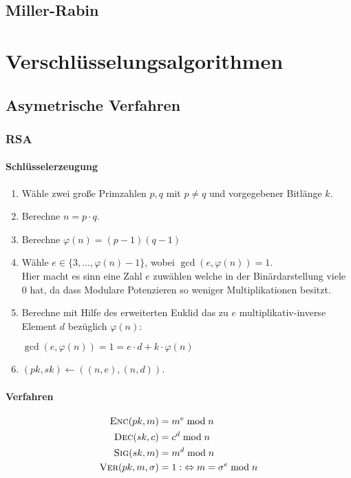 \documentclass[a4paper,landscape]{article}
\newcommand{\plaint}{\ensuremath{m}}
\newcommand{\ciphert}{\ensuremath{c}}
\newcommand{\skey}{\ensuremath{sk}}
\newcommand{\pkey}{\ensuremath{pk}}
\newcommand{\enc}{\textsc{Enc}}
\newcommand{\dec}{\textsc{Dec}}
\newcommand{\sig}{\textsc{Sig}}
\newcommand{\ver}{\textsc{Ver}}
\begin{document}
\begin{multicols*}{4}
	\subsection{Miller-Rabin}

	\section{Verschlüsselungsalgorithmen}
	\subsection{Asymetrische Verfahren}
	\subsubsection{RSA}
	\paragraph{Schlüsselerzeugung}
	\begin{enumerate}
		\item Wähle zwei große Primzahlen \(p, q\) mit \(p \neq q\) und
		      vorgegebener Bitlänge \(k\).
		\item Berechne \(n = p \cdot q\).
		\item Berechne \(\varphi(n) = (p - 1)(q - 1)\)
		\item Wähle \(e \in \{3, \dotsc, \varphi(n) - 1\}\), wobei
		      \(\gcd(e, \varphi(n)) = 1\). \\
		      Hier macht es sinn eine Zahl \(e\) zuwählen welche in der
		      Binärdarstellung viele \(0\) hat, da dass Modulare Potenzieren so
		      weniger Multiplikationen besitzt.
		\item Berechne mit Hilfe des erweiterten Euklid das zu \(e\)
		      multiplikativ-inverse Element \(d\) bezüglich
		      \(\varphi(n)\): \par
		      \(\gcd(e,\varphi(n)) = 1 = e \cdot d + k \cdot \varphi(n)\)
		\item \((\pkey, \skey) \leftarrow ((n,e), (n,d))\).
	\end{enumerate}

	\paragraph{Verfahren}
	\begin{align*}
		\enc(\pkey,\plaint)        & = \plaint^{e} \bmod n                               \\
		\dec(\skey,\ciphert)       & = \ciphert^{d} \bmod n                              \\
		\sig(\skey,\plaint)        & = \plaint^{d} \bmod n                               \\
		\ver(\pkey,\plaint,\sigma) & = 1 :\;\Leftrightarrow \plaint = \sigma^{e} \bmod n
	\end{align*}


\end{multicols*}
\end{document}
